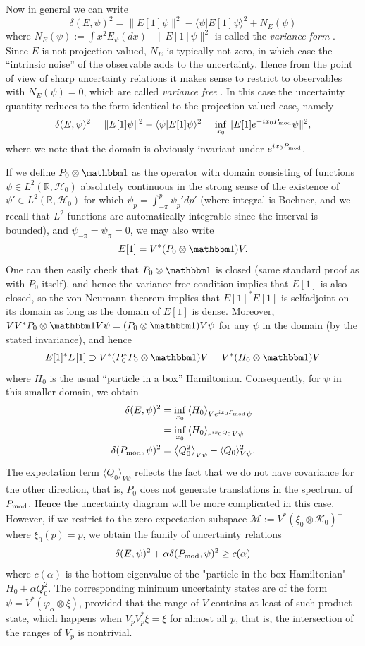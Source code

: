 Now in general we can write 
$$
\delta(E,\psi)^2 = \|E[1]\psi\|^2 - \langle \psi| E[1]\psi\rangle^2 + N_E(\psi)
$$
where $N_E(\psi) := \int x^2 E_\psi(dx) -\|E[1]\psi\|^2$ is called the \emph{variance form} \cite{werner-screen-obs-1986}. Since $E$ is not projection valued, $N_E$ is typically not zero, in which case the ``intrinsic noise'' of the observable adds to the uncertainty. Hence from the point of view of sharp uncertainty relations it makes sense to restrict to observables with $N_E(\psi)=0$, which are called \emph{variance free} \cite{}. In this case the uncertainty quantity reduces to the form identical to the projection valued case, namely
$$
\delta(E,\psi)^2 = \|E[1]\psi\|^2 - \langle \psi| E[1]\psi\rangle^2 = \inf_{x_0} \| E[1]e^{-ix_0P_{\mathrm{mod}}}\psi\|^2,
$$
where we note that the domain is obviously invariant under $e^{ix_0P_{\mathrm{mod}}}$.

If we define $P_0\otimes \id$ as the operator with domain consisting of functions $\psi\in L^2(\mathbb R,\mathcal H_0)$ absolutely continuous in the strong sense of the existence of $\psi'\in L^2(\mathbb R,\mathcal H_0)$ for which $\psi_p = \int_{-\pi}^p \psi_p'dp'$ (where integral is Bochner, and we recall that $L^2$-functions are automatically integrable since the interval is bounded), and $\psi_{-\pi}=\psi_\pi=0$, we may also write
$$
E[1] = V^* (P_0\otimes \id) V.
$$
One can then easily check that $P_0\otimes \id$ is closed (same standard proof as with $P_0$ itself), and hence the variance-free condition implies that $E[1]$ is also closed, so the von Neumann theorem implies that $E[1]^*E[1]$ is selfadjoint on its domain as long as the domain of $E[1]$ is dense. Moreover, $VV^*P_0\otimes \id V\psi=(P_0\otimes \id) V\psi$ for any $\psi$ in the domain (by the stated invariance), and hence 
$$
E[1]^*E[1]\supset V^*(P_0^*P_0\otimes \id)V = V^*(H_0\otimes \id)V
$$
where $H_0$ is the usual ``particle in a box'' Hamiltonian. Consequently, for $\psi$ in this smaller domain, we obtain
\begin{align*}
  \delta(E,\psi)^2 &= \inf_{x_0} \left\langle{H_0}\right\rangle_{Ve^{i x_0P_{\mathrm{mod}}}\psi}\\
                   &= \inf_{x_0} \left\langle{H_0}\right\rangle_{e^{i x_0 Q_0}V\psi}\\
  \delta(P_{\mathrm{mod}},\psi)^2 &= \left\langle{Q_0^2}\right\rangle_{V\psi} -\langle Q_0\rangle_{V\psi}^2.
\end{align*}
The expectation term $\langle Q_0\rangle_{V\psi}$ reflects the fact that we do not have covariance for the other direction, that is, $P_0$ does not generate translations in the spectrum of $P_{\mathrm{mod}}$. Hence the uncertainty diagram will be more complicated in this case. However, if we restrict to the zero expectation subspace $\mathcal M := V^*(\xi_0\otimes \mathcal K_0)^\perp$ where
$\xi_0(p) =p$, we obtain the family of uncertainty relations
$$
\delta(E,\psi)^2+\alpha\delta(P_{\mathrm{mod}},\psi)^2\geq c(\alpha)
$$
where $c(\alpha)$ is the bottom eigenvalue of the "particle in the box Hamiltonian" $H_0+\alpha Q_0^2$. The corresponding minimum uncertainty states are of the form $\psi = V^*(\varphi_\alpha\otimes\xi)$, provided that the range of $V$ contains at least of such product state, which happens when $V_pV_p^*\xi =\xi$ for almost all $p$, that is, the intersection of the ranges of $V_p$ is nontrivial.

